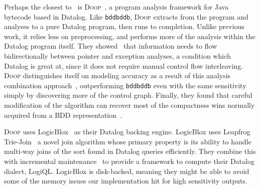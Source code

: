 Perhaps the closest to \aliasname\ is \textsc{Doop}~\cite{doop1,doop2,doop3}, a program analysis framework for Java bytecode based in Datalog.
Like \texttt{bddbddb}, \textsc{Doop} extracts from the program and analyses to a pure Datalog program, then runs to completion.
Unlike previous work, it relies less on preprocessing, and performs more of the analysis within the Datalog program itself.
They showed~\cite{doop1} that information needs to flow bidirectionally between pointer and exception analyses, a condition which Datalog is great at, since it does not require manual control flow interleaving.
\textsc{Doop} distinguishes itself on modeling accuracy as a result of this analysis combination approach~\cite{doop2}, outperforming \texttt{bddbddb} even with the same sensitivity simply by discovering more of the control graph.
Finally, they found that careful modification of the algorithm can recover most of the compactness wins normally acquired from a BDD representation~\cite{doop3}.

\textsc{Doop} uses LogicBlox~\cite{logicblox} as their Datalog backing engine.
LogicBlox uses Leapfrog Trie-Join~\cite{lftj} a novel join algorithm whose primary property is its ability to handle multi-way joins of the sort found in Datalog queries efficiently.
They combine this with incremental maintenance~\cite{lftj-incr} to provide a framework to compute their Datalog dialect, LogiQL.
LogicBlox is disk-backed, meaning they might be able to avoid some of the memory issues our implementation hit for high sensitivity outputs.

